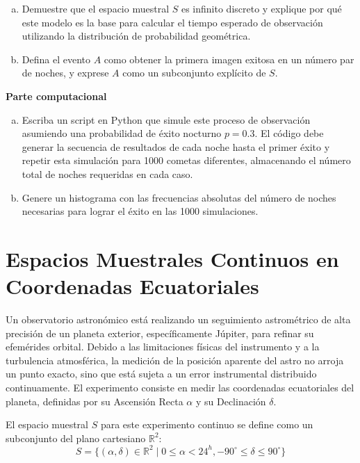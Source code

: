 \documentclass[a4paper]{article}
\begin{document}
\begin{enumerate}[a)]
\item Demuestre que el espacio muestral $S$ es infinito discreto y explique por qué este modelo es la base para calcular el tiempo esperado de observación utilizando la distribución de probabilidad geométrica.
\item Defina el evento $A$ como obtener la primera imagen exitosa en un número par de noches, y exprese $A$ como un subconjunto explícito de $S$.
\end{enumerate}

\textbf{Parte computacional}
\begin{enumerate}[a)]
\item Escriba un script en Python que simule este proceso de observación asumiendo una probabilidad de éxito nocturno $p = 0.3$. El código debe generar la secuencia de resultados de cada noche hasta el primer éxito y repetir esta simulación para 1000 cometas diferentes, almacenando el número total de noches requeridas en cada caso.
\item Genere un histograma con las frecuencias absolutas del número de noches necesarias para lograr el éxito en las 1000 simulaciones.
\end{enumerate}

\section{Espacios Muestrales Continuos en Coordenadas Ecuatoriales}
\label{sec:problema-04}

Un observatorio astronómico está realizando un seguimiento astrométrico de alta precisión de un planeta exterior, específicamente Júpiter, para refinar su efemérides orbital. Debido a las limitaciones físicas del instrumento y a la turbulencia atmosférica, la medición de la posición aparente del astro no arroja un punto exacto, sino que está sujeta a un error instrumental distribuido continuamente. El experimento consiste en medir las coordenadas ecuatoriales del planeta, definidas por su Ascensión Recta $\alpha$ y su Declinación $\delta$.

El espacio muestral $S$ para este experimento continuo se define como un subconjunto del plano cartesiano $\mathbb{R}^2$:
$$
S = \{(\alpha, \delta) \in \mathbb{R}^2 \mid 0 \leq \alpha < 24^h, -90^\circ \leq \delta \leq 90^\circ\}
$$
\end{document}
